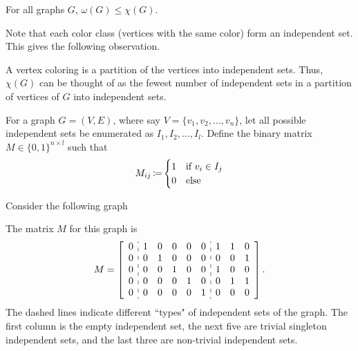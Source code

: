 \begin{thm}
    \label{thm:weak-duality-max-clique-min-coloring}
    For all graphs $G$, $\omega(G) \le \chi(G)$.
\end{thm}

Note that each color class (vertices with the same color) form an independent set. This gives the following observation.
\begin{obs}
    A vertex coloring is a partition of the vertices into independent sets. Thus, $\chi(G)$ can be thought of as the fewest number of independent sets in a partition of vertices of $G$ into independent sets.
\end{obs}

\begin{defn}
    For a graph $G = (V,E)$, where say $V=\{v_1, v_2, \dots, v_n\}$, let all possible independent sets be enumerated as $I_1, I_2, \dots, I_l$. Define the binary matrix $M \in \{0,1\}^{n\times l}$ such that
    \[
        M_{ij} \operatorname*{\coloneqq} \begin{cases}
                        1 & \text{if } v_i \in I_j \\
                        0 & \text{else}
                      \end{cases}
    \]
\end{defn}

\begin{exm}
    Consider the following graph
    \begin{center}
    \end{center}
    The matrix $M$ for this graph is
    \[
        M = \left[
            \begin{array}{c:ccccc:ccc}
                0 & 1 & 0 & 0 & 0 & 0 & 1 & 1 & 0 \\ 
                0 & 0 & 1 & 0 & 0 & 0 & 0 & 0 & 1 \\ 
                0 & 0 & 0 & 1 & 0 & 0 & 1 & 0 & 0 \\
                0 & 0 & 0 & 0 & 1 & 0 & 0 & 1 & 1 \\
                0 & 0 & 0 & 0 & 0 & 1 & 0 & 0 & 0
            \end{array}
            \right].
    \]
    The dashed lines indicate different ``types" of independent sets of the graph.
    The first column is the empty independent set,
    the next five are trivial singleton independent sets, and
    the last three are non-trivial independent sets.
\end{exm}

